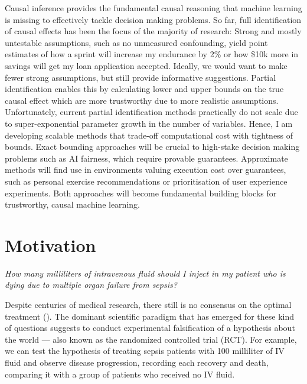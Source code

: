 \documentclass{article}
\begin{document}
Causal inference provides the fundamental causal reasoning that machine learning is missing to effectively tackle decision making problems. So far, full identification of causal effects has been the focus of the majority of research: Strong and mostly untestable assumptions, such as no unmeasured confounding, yield point estimates of how a sprint will increase my endurance by 2\% or how \$10k more in savings will get my loan application accepted. Ideally, we would want to make fewer strong assumptions, but still provide informative suggestions. Partial identification enables this by calculating lower and upper bounds on the true causal effect which are more trustworthy due to more realistic assumptions. Unfortunately, current partial identification methods practically do not scale due to super-exponential parameter growth in the number of variables. Hence, I am developing scalable methods that trade-off computational cost with tightness of bounds. Exact bounding approaches will be crucial to high-stake decision making problems such as AI fairness, which require provable guarantees. Approximate methods will find use in environments valuing execution cost over guarantees, such as personal exercise recommendations or prioritisation of user experience experiments. Both approaches will become fundamental building blocks for trustworthy, causal machine learning.

\section{Motivation}
\label{sec:motivation}


\begin{center}
\textit{How many milliliters of intravenous fluid should I inject in my patient who is dying due to multiple organ failure from sepsis?} 
\end{center}

\smallskip

Despite centuries of medical research, there still is no consensus on the optimal treatment (\cite{byrne2017fluid}). The dominant scientific paradigm that has emerged for these kind of questions suggests to conduct experimental falsification of a hypothesis about the world — also known as the randomized controlled trial (RCT). For example, we can test the hypothesis of treating sepsis patients with 100 milliliter of IV fluid and observe disease progression, recording each recovery and death, comparing it with a group of patients who received no IV fluid.
\end{document}
